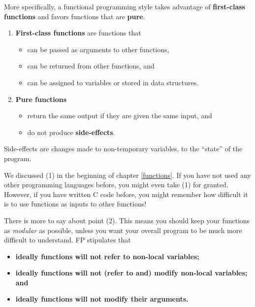 \documentclass[12pt,krantz2]{krantz}
\providecommand{\tightlist}{%
  \setlength{\itemsep}{0pt}\setlength{\parskip}{0pt}}
\begin{document}
More specifically, a functional programming style takes advantage of \textbf{first-class functions} and favors functions that are \textbf{pure}.

\begin{enumerate}
\def\labelenumi{\arabic{enumi}.}
\tightlist
\item
  \textbf{First-class functions} are \citep{struc_and_interp} functions that

  \begin{itemize}
  \tightlist
  \item
    can be passed as arguments to other functions,
  \item
    can be returned from other functions, and
  \item
    can be assigned to variables or stored in data structures.
  \end{itemize}
\item
  \textbf{Pure functions}

  \begin{itemize}
  \tightlist
  \item
    return the same output if they are given the same input, and
  \item
    do not produce \textbf{side-effects}.
  \end{itemize}
\end{enumerate}

Side-effects are changes made to non-temporary variables, to the ``state'' of the program.

We discussed (1) in the beginning of chapter \ref{functions}. If you have not used any other programming languages before, you might even take (1) for granted. However, if you have written C code before, you might remember how difficult it is to use functions as inputs to other functions!

There is more to say about point (2). This means you should keep your functions as \emph{modular} as possible, unless you want your overall program to be much more difficult to understand. FP stipulates that

\begin{itemize}
\item
  \textbf{ideally functions will not refer to non-local variables;}
\item
  \textbf{ideally functions will not (refer to and) modify non-local variables; and}
\item
  \textbf{ideally functions will not modify their arguments.}
\end{itemize}
\end{document}
